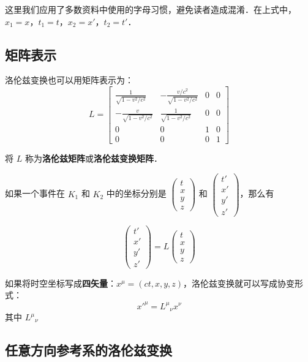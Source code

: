 这里我们应用了多数资料中使用的字母习惯，避免读者造成混淆．在上式中，$x_1=x$，$t_1=t$，$x_2=x'$，$t_2=t'$．

\subsection{矩阵表示}

洛伦兹变换也可以用矩阵表示为：
\begin{equation}
L=
\left[\begin{matrix}
\frac{1}{\sqrt{1-v^2/c^2}}& -\frac{v/c^2}{\sqrt{1-v^2/c^2}}& 0& 0\\
-\frac{v}{\sqrt{1-v^2/c^2}}& \frac{1}{\sqrt{1-v^2/c^2}}& 0& 0\\
0&0&1&0\\
0&0&0&1
\end{matrix}\right]
\end{equation}

将 $L$ 称为\textbf{洛伦兹矩阵}或\textbf{洛伦兹变换矩阵}．

如果一个事件在 $K_1$ 和 $K_2$ 中的坐标分别是 $\left(\begin{matrix}   t\\x\\y\\z    \end{matrix}\right)$ 和 $\left(\begin{matrix}   t'\\x'\\y'\\z'    \end{matrix}\right)$，那么有

\begin{equation}
\left(\begin{matrix}   t'\\x'\\y'\\z'    \end{matrix}\right)
=
L
\left(\begin{matrix}   t\\x\\y\\z    \end{matrix}\right)
\end{equation}

如果将时空坐标写成\textbf{四矢量}：$x^{\mu}=(ct,x,y,z)$，洛伦兹变换就可以写成协变形式：
\begin{equation}
x'^{\mu}={L^\mu}_\nu x^\nu
\end{equation}
其中 ${L^\mu}_\nu$
\subsection{任意方向参考系的洛伦兹变换}